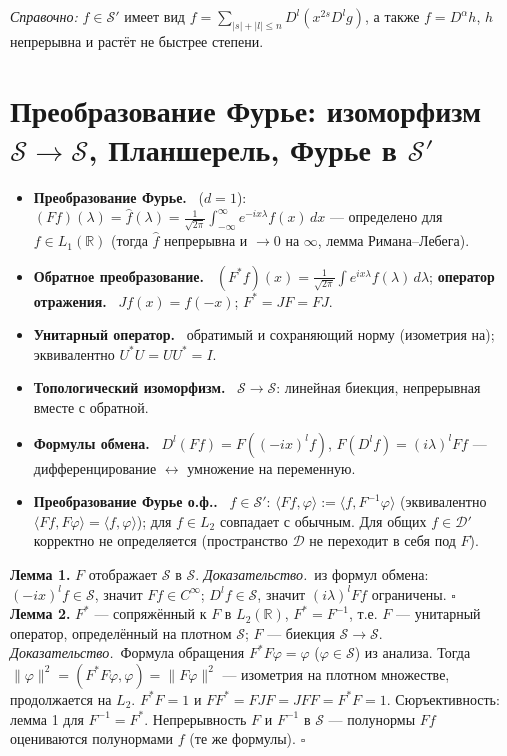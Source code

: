 \documentclass[11pt,a4paper]{article}
\newcommand{\RR}{\mathbb R}
\newcommand{\DD}{\mathcal D}
\newcommand{\Sc}{\mathcal S}
\newcommand{\df}[1]{\textbf{#1.}~}
\newcommand{\pf}{\textit{Доказательство.}~}
\newcommand{\qedd}{\hfill$\square$}
\begin{document}
\textit{Справочно:} $f\in\Sc'$ имеет вид $f=\sum_{|s|+|l|\le n}D^l(x^{2s}D^lg)$, а также $f=D^\alpha h$, $h$ непрерывна и растёт не быстрее степени.

\section{Преобразование Фурье: изоморфизм $\Sc\to\Sc$, Планшерель, Фурье в $\Sc'$}
\begin{defs}
\begin{itemize}
\item \df{Преобразование Фурье} ($d=1$): $(Ff)(\lambda)=\hat f(\lambda)=\frac1{\sqrt{2\pi}}\int_{-\infty}^\infty e^{-ix\lambda}f(x)\,dx$ — определено для $f\in L_1(\RR)$ (тогда $\hat f$ непрерывна и $\to0$ на $\infty$, лемма Римана–Лебега).
\item \df{Обратное преобразование} $(F^*f)(x)=\frac1{\sqrt{2\pi}}\int e^{ix\lambda}f(\lambda)\,d\lambda$; \df{оператор отражения} $Jf(x)=f(-x)$; $F^*=JF=FJ$.
\item \df{Унитарный оператор} обратимый и сохраняющий норму (изометрия на); эквивалентно $U^*U=UU^*=I$.
\item \df{Топологический изоморфизм} $\Sc\to\Sc$: линейная биекция, непрерывная вместе с обратной.
\item \df{Формулы обмена} $D^l(Ff)=F((-ix)^lf)$, $F(D^lf)=(i\lambda)^lFf$ — дифференцирование $\leftrightarrow$ умножение на переменную.
\item \df{Преобразование Фурье о.ф.} $f\in\Sc'$: $\langle Ff,\varphi\rangle:=\langle f,F^{-1}\varphi\rangle$ (эквивалентно $\langle Ff,F\varphi\rangle=\langle f,\varphi\rangle$); для $f\in L_2$ совпадает с обычным. Для общих $f\in\DD'$ корректно не определяется (пространство $\DD$ не переходит в себя под $F$).
\end{itemize}
\end{defs}

\textbf{Лемма 1.} $F$ отображает $\Sc$ в $\Sc$. \pf из формул обмена: $(-ix)^lf\in\Sc$, значит $Ff\in C^\infty$; $D^lf\in\Sc$, значит $(i\lambda)^lFf$ ограничены. \qedd\\
\textbf{Лемма 2.} $F^*$ — сопряжённый к $F$ в $L_2(\RR)$, $F^*=F^{-1}$, т.е. $F$ — унитарный оператор, определённый на плотном $\Sc$; $F$ — биекция $\Sc\to\Sc$.\\
\pf Формула обращения $F^*F\varphi=\varphi$ ($\varphi\in\Sc$) из анализа. Тогда $\|\varphi\|^2=(F^*F\varphi,\varphi)=\|F\varphi\|^2$ — изометрия на плотном множестве, продолжается на $L_2$. $F^*F=1$ и $FF^*=FJF=JFF=F^*F=1$. Сюръективность: лемма 1 для $F^{-1}=F^*$. Непрерывность $F$ и $F^{-1}$ в $\Sc$ — полунормы $Ff$ оцениваются полунормами $f$ (те же формулы). \qedd
\end{document}
